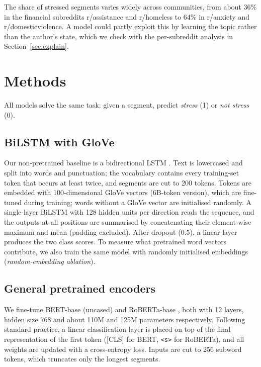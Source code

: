 The share of stressed segments varies widely across communities, from about 36\% in the financial
subreddits r/assistance and r/homeless to 64\% in r/anxiety and r/domesticviolence. A model could
partly exploit this by learning the topic rather than the author's state, which we check with the
per-subreddit analysis in Section~\ref{sec:explain}.

\section{Methods}
\label{sec:methods}
All models solve the same task: given a segment, predict \emph{stress} (1) or \emph{not stress} (0).

\subsection{BiLSTM with GloVe}
Our non-pretrained baseline is a bidirectional LSTM \cite{hochreiter1997lstm}. Text is lowercased
and split into words and punctuation; the vocabulary contains every training-set token that occurs
at least twice, and segments are cut to 200 tokens. Tokens are embedded with 100-dimensional GloVe
vectors \cite{pennington2014glove} (6B-token version), which are fine-tuned during training; words
without a GloVe vector are initialised randomly. A single-layer BiLSTM with 128 hidden units per
direction reads the sequence, and the outputs at all positions are summarised by concatenating their
element-wise maximum and mean (padding excluded). After dropout (0.5), a linear layer produces the
two class scores. To measure what pretrained word vectors contribute, we also train the same model
with randomly initialised embeddings (\emph{random-embedding ablation}).

\subsection{General pretrained encoders}
We fine-tune BERT-base (uncased) \cite{devlin2019bert} and RoBERTa-base \cite{liu2019roberta}, both
with 12 layers, hidden size 768 and about 110M and 125M parameters respectively. Following standard
practice, a linear classification layer is placed on top of the final representation of the first
token ([CLS] for BERT, \texttt{<s>} for RoBERTa), and all weights are updated with a cross-entropy
loss. Inputs are cut to 256 subword tokens, which truncates only the longest segments.

